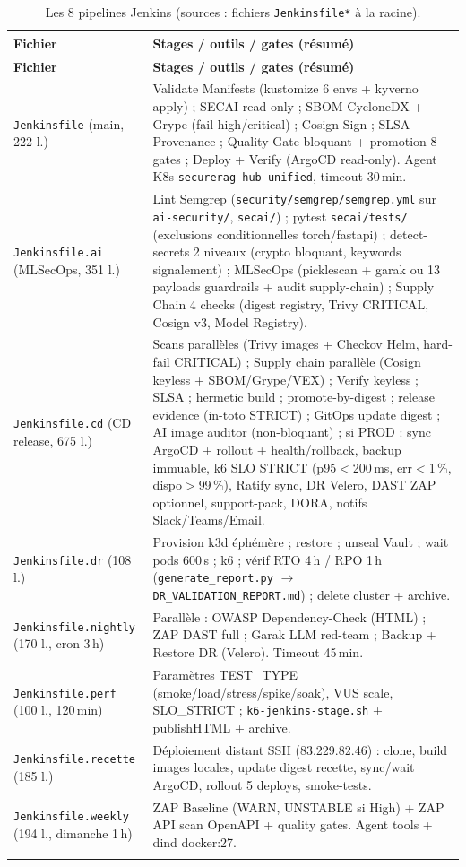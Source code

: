 \documentclass[12pt,a4paper,openany]{report}
\begin{document}
\begin{longtable}{@{}lp{9.5cm}@{}}
\toprule
\textbf{Fichier} & \textbf{Stages / outils / gates (résumé)} \\
\midrule
\endfirsthead
\toprule
\textbf{Fichier} & \textbf{Stages / outils / gates (résumé)} \\
\midrule
\endhead
\texttt{Jenkinsfile} (main, 222 l.) &
Validate Manifests (kustomize 6 envs + kyverno apply) ;
SECAI read-only ; SBOM CycloneDX + Grype (fail high/critical) ;
Cosign Sign ; SLSA Provenance ; Quality Gate bloquant + promotion 8 gates ;
Deploy + Verify (ArgoCD read-only). Agent K8s \texttt{securerag-hub-unified}, timeout 30\,min. \\
\texttt{Jenkinsfile.ai} (MLSecOps, 351 l.) &
Lint Semgrep (\texttt{security/semgrep/semgrep.yml} sur \texttt{ai-security/}, \texttt{secai/}) ;
pytest \texttt{secai/tests/} (exclusions conditionnelles torch/fastapi) ;
detect-secrets 2 niveaux (crypto bloquant, keywords signalement) ;
MLSecOps (picklescan + garak ou 13 payloads guardrails + audit supply-chain) ;
Supply Chain 4 checks (digest registry, Trivy CRITICAL, Cosign v3, Model Registry). \\
\texttt{Jenkinsfile.cd} (CD release, 675 l.) &
Scans parallèles (Trivy images + Checkov Helm, hard-fail CRITICAL) ;
Supply chain parallèle (Cosign keyless + SBOM/Grype/VEX) ;
Verify keyless ; SLSA ; hermetic build ; promote-by-digest ;
release evidence (in-toto STRICT) ; GitOps update digest ;
AI image auditor (non-bloquant) ; si PROD : sync ArgoCD + rollout + health/rollback,
backup immuable, k6 SLO STRICT (p95$<$200\,ms, err$<$1\,\%, dispo$>$99\,\%),
Ratify sync, DR Velero, DAST ZAP optionnel, support-pack, DORA, notifs Slack/Teams/Email. \\
\texttt{Jenkinsfile.dr} (108 l.) &
Provision k3d éphémère ; restore ; unseal Vault ; wait pods 600\,s ;
k6 ; vérif RTO 4\,h / RPO 1\,h (\texttt{generate\_report.py} $\rightarrow$ \texttt{DR\_VALIDATION\_REPORT.md}) ;
delete cluster + archive. \\
\texttt{Jenkinsfile.nightly} (170 l., cron 3\,h) &
Parallèle : OWASP Dependency-Check (HTML) ; ZAP DAST full ;
Garak LLM red-team ; Backup + Restore DR (Velero). Timeout 45\,min. \\
\texttt{Jenkinsfile.perf} (100 l., 120\,min) &
Paramètres TEST\_TYPE (smoke/load/stress/spike/soak), VUS scale, SLO\_STRICT ;
\texttt{k6-jenkins-stage.sh} + publishHTML + archive. \\
\texttt{Jenkinsfile.recette} (185 l.) &
Déploiement distant SSH (83.229.82.46) : clone, build images locales,
update digest recette, sync/wait ArgoCD, rollout 5 deploys, smoke-tests. \\
\texttt{Jenkinsfile.weekly} (194 l., dimanche 1\,h) &
ZAP Baseline (WARN, UNSTABLE si High) + ZAP API scan OpenAPI + quality gates.
Agent tools + dind docker:27. \\
\bottomrule
\caption{Les 8 pipelines Jenkins (sources : fichiers \texttt{Jenkinsfile*} à la racine).}
\label{tab:jenkinsfiles}
\end{longtable}
\end{document}
